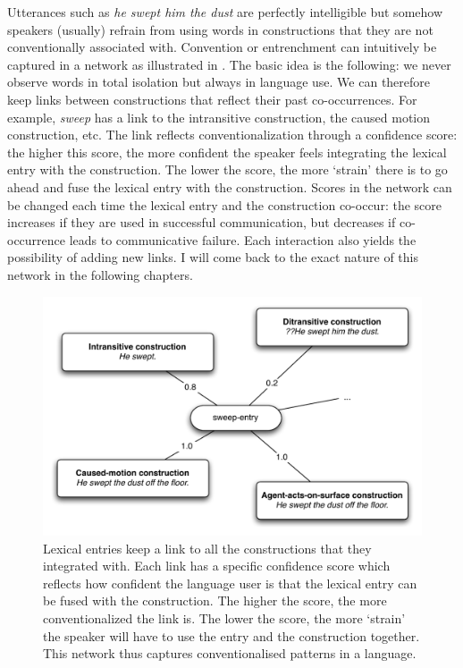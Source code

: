 Utterances such as {\em *he swept him the dust} are perfectly intelligible but somehow speakers (usually) refrain from using words in constructions that they are not conventionally associated with. Convention or entrenchment can intuitively be captured in a network as illustrated in . The basic idea is the following: we never observe words in total isolation but always in language use. We can therefore keep links between constructions that reflect their past co-occurrences. For example, {\em sweep} has a link to the intransitive construction, the caused motion construction, etc. The link reflects conventionalization through a confidence score: the higher this score, the more confident the speaker feels integrating the lexical entry with the construction. The lower the score, the more `strain' there is to go ahead and fuse the lexical entry with the construction. Scores in the network can be changed each time the lexical entry and the construction co-occur: the score increases if they are used in successful communication, but decreases if co-occurrence leads to communicative failure. Each interaction also yields the possibility of adding new links. I will come back to the exact nature of this network in the following chapters.

\begin{figure}[tb]
\centerline{\includegraphics[width=\linewidth]{Chapter2/figs/network}}
 \caption[Network for {\em sweep}]{Lexical entries keep a link to all the constructions that they integrated with. Each link has a specific confidence score which reflects how confident the language user is that the lexical entry can be fused with the construction. The higher the score, the more conventionalized the link is. The lower the score, the more `strain' the speaker will have to use the entry and the construction together. This network thus captures conventionalised patterns in a language.}
   \label{f:network-sweep}
\end{figure}
